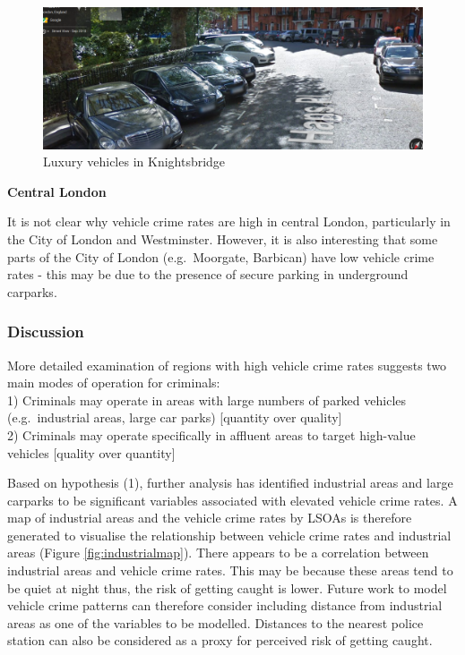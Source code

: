 \documentclass[]{article}
\theoremstyle{definition}
\theoremstyle{definition}
\theoremstyle{definition}
\theoremstyle{remark}
\begin{document}
\begin{figure}
\centering
\includegraphics{pictures/Knightsbridge.png}
\caption{Luxury vehicles in Knightsbridge}
\end{figure}

\textbf{Central London}

It is not clear why vehicle crime rates are high in central London,
particularly in the City of London and Westminster. However, it is also
interesting that some parts of the City of London (e.g.~Moorgate,
Barbican) have low vehicle crime rates - this may be due to the presence
of secure parking in underground carparks.

\subsubsection{Discussion}\label{discussion}

More detailed examination of regions with high vehicle crime rates
suggests two main modes of operation for criminals:\\
1) Criminals may operate in areas with large numbers of parked vehicles
(e.g.~industrial areas, large car parks) {[}quantity over quality{]}\\
2) Criminals may operate specifically in affluent areas to target
high-value vehicles {[}quality over quantity{]}

Based on hypothesis (1), further analysis has identified industrial
areas and large carparks to be significant variables associated with
elevated vehicle crime rates. A map of industrial areas and the vehicle
crime rates by LSOAs is therefore generated to visualise the
relationship between vehicle crime rates and industrial areas (Figure
\ref{fig:industrialmap}). There appears to be a correlation between
industrial areas and vehicle crime rates. This may be because these
areas tend to be quiet at night thus, the risk of getting caught is
lower. Future work to model vehicle crime patterns can therefore
consider including distance from industrial areas as one of the
variables to be modelled. Distances to the nearest police station can
also be considered as a proxy for perceived risk of getting caught.
\end{document}
